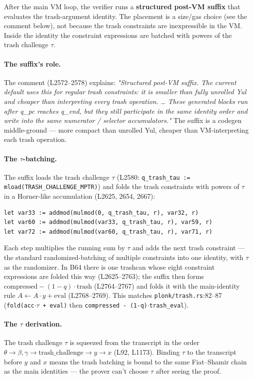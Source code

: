 After the main VM loop, the verifier runs a \textbf{structured
post-VM suffix} that evaluates the trash-argument identity. The
placement is a size/gas choice (see the comment below), not
because the trash constraints are inexpressible in the VM. Inside
the identity the constraint expressions are batched with powers
of the trash challenge $\tau$.

\paragraph{The suffix's role.} The comment (L2572--2578) explains:
\emph{"Structured post-VM suffix. The current default uses this
for regular trash constraints: it is smaller than fully unrolled
Yul and cheaper than interpreting every trash operation. \dots
These generated blocks run after q\_pc reaches q\_end, but they
still participate in the same identity order and write into the
same numerator / selector accumulators."} The suffix is a
codegen middle-ground --- more compact than unrolled Yul, cheaper
than VM-interpreting each trash operation.

\paragraph{The $\tau$-batching.} The suffix loads the trash
challenge $\tau$ (L2580: \texttt{q\_\allowbreak{}trash\_\allowbreak{}tau :=
mload(TRASH\_\allowbreak{}CHALLENGE\_\allowbreak{}MPTR)}) and folds the trash constraints
with powers of $\tau$ in a Horner-like accumulation (L2625,
2654, 2667):
\begin{lstlisting}[style=yul]
let var33 := addmod(mulmod(0, q_trash_tau, r), var32, r)
let var60 := addmod(mulmod(var33, q_trash_tau, r), var59, r)
let var72 := addmod(mulmod(var60, q_trash_tau, r), var71, r)
\end{lstlisting}
Each step multiplies the running sum by $\tau$ and adds the next
trash constraint --- the standard randomized-batching of multiple
constraints into one identity, with $\tau$ as the randomizer. In
B64 there is one trashcan whose eight constraint expressions are
folded this way (L2625--2763); the suffix then forms
$\text{compressed}-(1-q)\cdot\text{trash}$ (L2764--2767) and
folds it with the main-identity rule
$A\leftarrow A\cdot y+\text{eval}$ (L2768--2769). This matches
\texttt{plonk/trash.rs}:82--87 (\texttt{fold(acc$\cdot\tau$ +
eval)} then \texttt{compressed - (1-q)$\cdot$trash\_\allowbreak{}eval}).

\paragraph{The $\tau$ derivation.} The trash challenge $\tau$ is
squeezed from the transcript in the order
$\theta \to \beta, \gamma \to \text{trash\_challenge} \to y \to
x$ (L92, L1173). Binding $\tau$ to the transcript before $y$ and
$x$ means the trash batching is bound to the same Fiat--Shamir
chain as the main identities --- the prover can't choose $\tau$
after seeing the proof.

